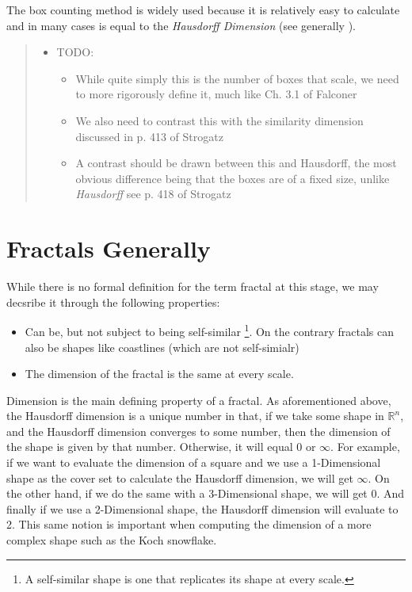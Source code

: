 \documentclass[11pt]{article}
\begin{document}
The box counting method is widely used because it is relatively easy to calculate \cite[p. 41]{falconerFractalGeometryMathematical2003b} and in many cases is equal to the \emph{Hausdorff Dimension}  \cite[p. 11]{markpollicottFractalsDimensionTheory2005} (see generally \cite{ListFractalsHausdorff2020}).

\begin{quote}
\begin{itemize}
\item TODO:
\begin{itemize}
\item While quite simply this is the number of boxes that scale, we need to more rigorously define it, much like Ch. 3.1 of Falconer \cite{falconerFractalGeometryMathematical2003}
\item We also need to contrast this with the similarity dimension discussed in p. 413 of Strogatz \cite{strogatzNonlinearDynamicsChaos2015}
\item A contrast should be drawn between this and Hausdorff, the most obvious difference being that the boxes are of a fixed size, unlike \emph{Hausdorff}  see p. 418 of Strogatz \cite{strogatzNonlinearDynamicsChaos2015}
\end{itemize}
\end{itemize}
\end{quote}
\section{Fractals Generally}
\label{sec:org017f271}
While there is no formal definition for the term fractal at this stage, we may decsribe it through the following properties:
\begin{itemize}
\item Can be, but not subject to being self-similar \footnote{A self-similar shape is one that replicates its shape at every scale.}. On the contrary fractals can also be shapes like coastlines (which are not self-simialr)
\item The dimension of the fractal is the same at every scale.
\end{itemize}

Dimension is the main defining property of a fractal. As aforementioned above, the Hausdorff dimension is a unique number in that, if we take some shape in \(\mathbb{R}^{n}\), and the Hausdorff dimension converges to some number, then the dimension of the shape is given by that number. Otherwise, it will equal \(0\) or \(\infty\). For example, if we want to evaluate the dimension of a square and we use a 1-Dimensional shape as the cover set to calculate the Hausdorff dimension, we will get \(\infty\). On the other hand, if we do the same with a 3-Dimensional shape, we will get 0. And finally if we use a 2-Dimensional shape, the Hausdorff dimension will evaluate to 2. This same notion is important when computing the dimension of a more complex shape such as the Koch snowflake.
\end{document}
